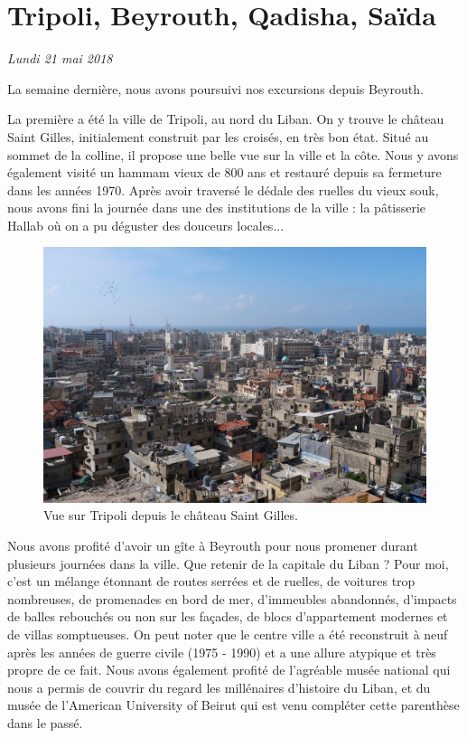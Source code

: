 \hypertarget{tripoli-beyrouth-qadisha-sauxefda}{%
\section{Tripoli, Beyrouth, Qadisha,
Saïda}\label{tripoli-beyrouth-qadisha-sauxefda}}

\emph{Lundi 21 mai 2018}

\hypertarget{mapid}{}

La semaine dernière, nous avons poursuivi nos excursions depuis
Beyrouth.

La première a été la ville de Tripoli, au nord du Liban. On y trouve le
château Saint Gilles, initialement construit par les croisés, en très
bon état. Situé au sommet de la colline, il propose une belle vue sur la
ville et la côte. Nous y avons également visité un hammam vieux de 800
ans et restauré depuis sa fermeture dans les années 1970. Après avoir
traversé le dédale des ruelles du vieux souk, nous avons fini la journée
dans une des institutions de la ville : la pâtisserie Hallab où on a pu
déguster des douceurs locales...

\begin{figure}
\centering
\includegraphics{images/20180521_tripoli.JPG}
\caption{Vue sur Tripoli depuis le château Saint Gilles.}
\end{figure}

Nous avons profité d'avoir un gîte à Beyrouth pour nous promener durant
plusieurs journées dans la ville. Que retenir de la capitale du Liban ?
Pour moi, c'est un mélange étonnant de routes serrées et de ruelles, de
voitures trop nombreuses, de promenades en bord de mer, d'immeubles
abandonnés, d'impacts de balles rebouchés ou non sur les façades, de
blocs d'appartement modernes et de villas somptueuses. On peut noter que
le centre ville a été reconstruit à neuf après les années de guerre
civile (1975 - 1990) et a une allure atypique et très propre de ce fait.
Nous avons également profité de l'agréable musée national qui nous a
permis de couvrir du regard les millénaires d'histoire du Liban, et du
musée de l'American University of Beirut qui est venu compléter cette
parenthèse dans le passé.


